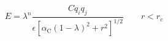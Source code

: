 


\[
E = \lambda^n \frac{ C q_i q_j}{\epsilon
\left[ \alpha_{\mathrm{C}} (1-\lambda)^2 + r^2 \right]^{1/2}} \qquad r < r_c
\]


